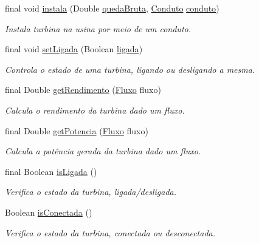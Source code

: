 \begin{DoxyCompactItemize}
final void \hyperlink{classusina_1_1_turbina_ad46569765ed883b27b39096e6e30ffe9}{instala} (Double \hyperlink{classusina_1_1_turbina_a74ca99529c8c56c1ffddba8bc914c442}{queda\-Bruta}, \hyperlink{classusina_1_1tubulacao_1_1_conduto}{Conduto} \hyperlink{classusina_1_1_turbina_aaf9ebcc66e369abbf1ccf644579e1348}{conduto})
\begin{DoxyCompactList}\small\item\em Instala turbina na usina por meio de um conduto. \end{DoxyCompactList}\item 
final void \hyperlink{classusina_1_1_turbina_aef2a44bda149b3bd9afd627145b53df2}{set\-Ligada} (Boolean \hyperlink{classusina_1_1_turbina_afe4aa27ba1150a9b4a2a7d9ec622ab4f}{ligada})
\begin{DoxyCompactList}\small\item\em Controla o estado de uma turbina, ligando ou desligando a mesma. \end{DoxyCompactList}\item 
final Double \hyperlink{classusina_1_1_turbina_ad7eb2929acee76d69ef06d67c01d0e1a}{get\-Rendimento} (\hyperlink{classusina_1_1_fluxo}{Fluxo} fluxo)
\begin{DoxyCompactList}\small\item\em Calcula o rendimento da turbina dado um fluxo. \end{DoxyCompactList}\item 
final Double \hyperlink{classusina_1_1_turbina_ab5f2692c54cf1e3fe6b30adc3b481710}{get\-Potencia} (\hyperlink{classusina_1_1_fluxo}{Fluxo} fluxo)
\begin{DoxyCompactList}\small\item\em Calcula a potência gerada da turbina dado um fluxo. \end{DoxyCompactList}\item 
final Boolean \hyperlink{classusina_1_1_turbina_a62d5a81d710e36542ca8a001bf16a3e1}{is\-Ligada} ()
\begin{DoxyCompactList}\small\item\em Verifica o estado da turbina, ligada/desligada. \end{DoxyCompactList}\item 
Boolean \hyperlink{classusina_1_1_turbina_aab5ba2c5ccb1f98ea31928d3197f8a88}{is\-Conectada} ()
\begin{DoxyCompactList}\small\item\em Verifica o estado da turbina, conectada ou desconectada. \end{DoxyCompactList}\item 

\end{DoxyCompactItemize}
